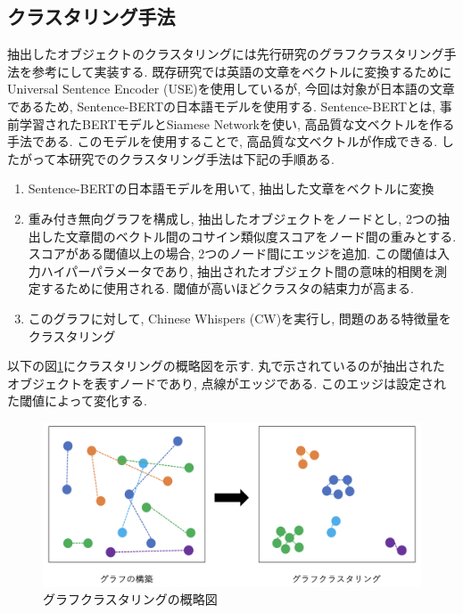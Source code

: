 \subsection{クラスタリング手法}
抽出したオブジェクトのクラスタリングには先行研究のグラフクラスタリング手法\cite{sira}を参考にして実装する. 既存研究では英語の文章をベクトルに変換するためにUniversal Sentence Encoder (USE)を使用しているが, 今回は対象が日本語の文章であるため, Sentence-BERTの日本語モデルを使用する. Sentence-BERT\cite{sentence-bert}とは, 事前学習されたBERTモデルとSiamese Networkを使い, 高品質な文ベクトルを作る手法である. このモデルを使用することで, 高品質な文ベクトルが作成できる. 
したがって本研究でのクラスタリング手法は下記の手順ある. 
\begin{enumerate}
  \item Sentence-BERTの日本語モデルを用いて, 抽出した文章をベクトルに変換
  \item 重み付き無向グラフを構成し, 抽出したオブジェクトをノードとし, 2つの抽出した文章間のベクトル間のコサイン類似度スコアをノード間の重みとする. スコアがある閾値以上の場合, 2つのノード間にエッジを追加. この閾値は入力ハイパーパラメータであり, 抽出されたオブジェクト間の意味的相関を測定するために使用される. 閾値が高いほどクラスタの結束力が高まる. 
  \item このグラフに対して, Chinese Whispers (CW)を実行し, 問題のある特徴量をクラスタリング
\end{enumerate}

以下の図\ref{fig:clustering}にクラスタリングの概略図を示す. 丸で示されているのが抽出されたオブジェクトを表すノードであり, 点線がエッジである. このエッジは設定された閾値によって変化する. 
\begin{figure}[hbtp]
  \centering
  \includegraphics[scale=0.4]
       {contents/images/clustering.png}
  \caption{グラフクラスタリングの概略図\label{fig:clustering}}
\end{figure}

